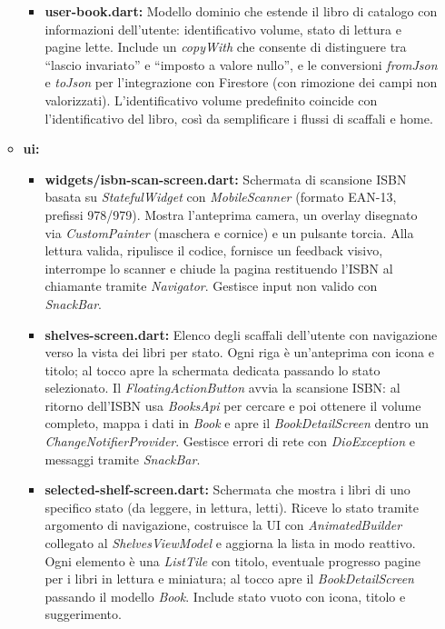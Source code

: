 \documentclass{article}
\begin{document}
\begin{itemize}
\begin{itemize}
\begin{itemize}
      \item \textbf{user-book.dart:}
      Modello dominio che estende il libro di catalogo con informazioni dell’utente: identificativo volume, stato di lettura e pagine lette. Include un \textit{copyWith} che consente di distinguere tra “lascio invariato” e “imposto a valore nullo”, e le conversioni \textit{fromJson} e \textit{toJson} per l’integrazione con Firestore (con rimozione dei campi non valorizzati). L’identificativo volume predefinito coincide con l’identificativo del libro, così da semplificare i flussi di scaffali e home.
    \end{itemize}
    \item \textbf{ui:}
    \begin{itemize}
      \item \textbf{widgets/isbn-scan-screen.dart:}
      Schermata di scansione ISBN basata su \textit{StatefulWidget} con \textit{MobileScanner} (formato EAN-13, prefissi 978/979). Mostra l’anteprima camera, un overlay disegnato via \textit{CustomPainter} (maschera e cornice) e un pulsante torcia. Alla lettura valida, ripulisce il codice, fornisce un feedback visivo, interrompe lo scanner e chiude la pagina restituendo l’ISBN al chiamante tramite \textit{Navigator}. Gestisce input non valido con \textit{SnackBar}.
      \item \textbf{shelves-screen.dart:}
      Elenco degli scaffali dell’utente con navigazione verso la vista dei libri per stato. Ogni riga è un’anteprima con icona e titolo; al tocco apre la schermata dedicata passando lo stato selezionato. Il \textit{FloatingActionButton} avvia la scansione ISBN: al ritorno dell’ISBN usa \textit{BooksApi} per cercare e poi ottenere il volume completo, mappa i dati in \textit{Book} e apre il \textit{BookDetailScreen} dentro un \textit{ChangeNotifierProvider}. Gestisce errori di rete con \textit{DioException} e messaggi tramite \textit{SnackBar}.
      \item \textbf{selected-shelf-screen.dart:}
      Schermata che mostra i libri di uno specifico stato (da leggere, in lettura, letti). Riceve lo stato tramite argomento di navigazione, costruisce la UI con \textit{AnimatedBuilder} collegato al \textit{ShelvesViewModel} e aggiorna la lista in modo reattivo. Ogni elemento è una \textit{ListTile} con titolo, eventuale progresso pagine per i libri in lettura e miniatura; al tocco apre il \textit{BookDetailScreen} passando il modello \textit{Book}. Include stato vuoto con icona, titolo e suggerimento.
    \end{itemize}

\end{itemize}
\end{itemize}
\end{document}
